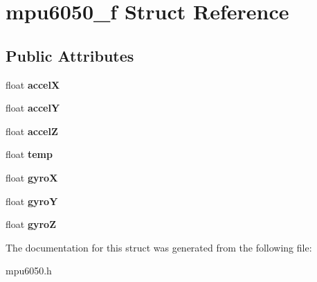 \hypertarget{structmpu6050__f}{}\section{mpu6050\+\_\+f Struct Reference}
\label{structmpu6050__f}
\subsection*{Public Attributes}
\begin{DoxyCompactItemize}
\item 
\mbox{\label{structmpu6050__f_ae1a231d8c1f6e9774d139f86827e66e9}} 
float {\bfseries accelX}
\item 
\mbox{\label{structmpu6050__f_a1621b7a2d56e6c51e43019fe3c0b9033}} 
float {\bfseries accelY}
\item 
\mbox{\label{structmpu6050__f_a0cddb44272fc95b87c8fb19caf59d4ac}} 
float {\bfseries accelZ}
\item 
\mbox{\label{structmpu6050__f_a6111a88fd6044126275b43e88be5bedc}} 
float {\bfseries temp}
\item 
\mbox{\label{structmpu6050__f_a800cead01d2de6ac814684a145ec7c53}} 
float {\bfseries gyroX}
\item 
\mbox{\label{structmpu6050__f_abc55afc127c40b7797bef8d4965b8939}} 
float {\bfseries gyroY}
\item 
\mbox{\label{structmpu6050__f_a7c3f52a114e6417080ebdbb3d6560a1a}} 
float {\bfseries gyroZ}
\end{DoxyCompactItemize}


The documentation for this struct was generated from the following file\+:\begin{DoxyCompactItemize}
\item 
mpu6050.\+h\end{DoxyCompactItemize}
